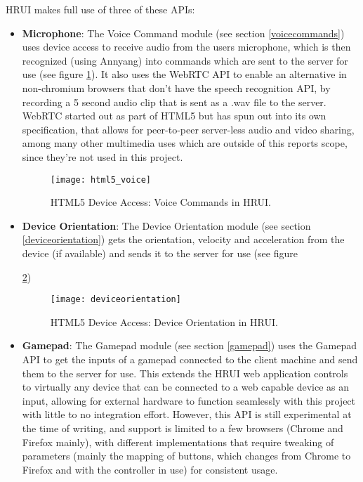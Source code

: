 HRUI makes full use of three of these APIs:\\

\begin{itemize}
  \item \textbf{Microphone}: The Voice Command module (see section \ref{voicecommands}) uses device access to receive audio
  from the users microphone, which is then recognized (using Annyang) into commands which are sent to the server for use (see
  figure \ref{html5_voice}). It also uses the WebRTC API to enable an alternative in non-chromium browsers that don't have the
  speech recognition API, by recording a 5 second audio clip that is sent as a .wav file to the server. WebRTC started out as
  part of HTML5 but has spun out into its own specification, that allows for peer-to-peer server-less audio and video sharing,
  among many other multimedia uses which are outside of this reports scope, since they're not used in this project.

  \begin{figure}[h]
    \begin{center}
      \texttt{[image: html5\_voice]}
    \end{center}
    \caption{HTML5 Device Access: Voice Commands in HRUI.\label{html5_voice}}
  \end{figure}
  \item \textbf{Device Orientation}: The Device Orientation module (see section \ref{deviceorientation}) gets the orientation,
   velocity and acceleration from the device (if available) and sends it to the server for use (see figure 

  \ref{html5_orientation})
  \begin{figure}[h]
    \begin{center}
      \texttt{[image: deviceorientation]}
    \end{center}
    \caption{HTML5 Device Access: Device Orientation in HRUI.\label{html5_orientation}}
  \end{figure}
  \item \textbf{Gamepad}: The Gamepad module (see section \ref{gamepad}) uses the Gamepad API to get the inputs of a gamepad
  connected to the client machine and send them to the server for use. This extends the HRUI web application controls to
  virtually any device that can be connected to a web capable device as an input, allowing for external hardware to function
  seamlessly with this project with little to no integration effort. However, this API is still experimental at the time of
  writing, and support is limited to a few browsers (Chrome and Firefox mainly), with different implementations that require
  tweaking of parameters (mainly the mapping of buttons, which changes from Chrome to Firefox and with the controller in use)
  for consistent usage.
\end{itemize}
